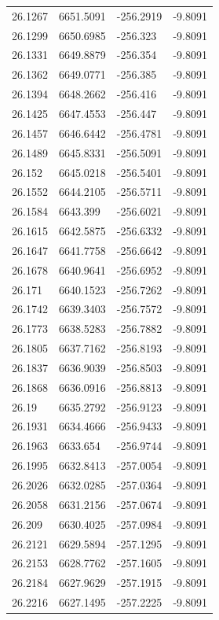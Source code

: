 \begin{table}[H]
\begin{tabular}{llll}
26.1267 & 6651.5091 & -256.2919 & -9.8091 \\
26.1299 & 6650.6985 & -256.323 & -9.8091 \\
26.1331 & 6649.8879 & -256.354 & -9.8091 \\
26.1362 & 6649.0771 & -256.385 & -9.8091 \\
26.1394 & 6648.2662 & -256.416 & -9.8091 \\
26.1425 & 6647.4553 & -256.447 & -9.8091 \\
26.1457 & 6646.6442 & -256.4781 & -9.8091 \\
26.1489 & 6645.8331 & -256.5091 & -9.8091 \\
26.152 & 6645.0218 & -256.5401 & -9.8091 \\
26.1552 & 6644.2105 & -256.5711 & -9.8091 \\
26.1584 & 6643.399 & -256.6021 & -9.8091 \\
26.1615 & 6642.5875 & -256.6332 & -9.8091 \\
26.1647 & 6641.7758 & -256.6642 & -9.8091 \\
26.1678 & 6640.9641 & -256.6952 & -9.8091 \\
26.171 & 6640.1523 & -256.7262 & -9.8091 \\
26.1742 & 6639.3403 & -256.7572 & -9.8091 \\
26.1773 & 6638.5283 & -256.7882 & -9.8091 \\
26.1805 & 6637.7162 & -256.8193 & -9.8091 \\
26.1837 & 6636.9039 & -256.8503 & -9.8091 \\
26.1868 & 6636.0916 & -256.8813 & -9.8091 \\
26.19 & 6635.2792 & -256.9123 & -9.8091 \\
26.1931 & 6634.4666 & -256.9433 & -9.8091 \\
26.1963 & 6633.654 & -256.9744 & -9.8091 \\
26.1995 & 6632.8413 & -257.0054 & -9.8091 \\
26.2026 & 6632.0285 & -257.0364 & -9.8091 \\
26.2058 & 6631.2156 & -257.0674 & -9.8091 \\
26.209 & 6630.4025 & -257.0984 & -9.8091 \\
26.2121 & 6629.5894 & -257.1295 & -9.8091 \\
26.2153 & 6628.7762 & -257.1605 & -9.8091 \\
26.2184 & 6627.9629 & -257.1915 & -9.8091 \\
26.2216 & 6627.1495 & -257.2225 & -9.8091 \\

\end{tabular}
\end{table}
